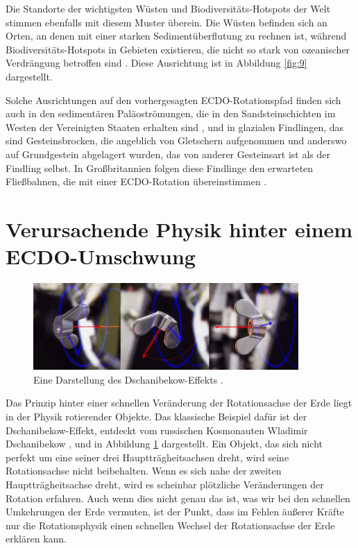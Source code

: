 \documentclass[10pt,twocolumn,letterpaper]{article}
\begin{document}
Die Standorte der wichtigsten Wüsten und Biodiversitäts-Hotspots der Welt stimmen ebenfalls mit diesem Muster überein. Die Wüsten befinden sich an Orten, an denen mit einer starken Sedimentüberflutung zu rechnen ist, während Biodiversitäts-Hotspots in Gebieten existieren, die nicht so stark von ozeanischer Verdrängung betroffen sind \cite{28}. Diese Ausrichtung ist in Abbildung \ref{fig:9} dargestellt.

Solche Ausrichtungen auf den vorhergesagten ECDO-Rotationspfad finden sich auch in den sedimentären Paläoströmungen, die in den Sandsteinschichten im Westen der Vereinigten Staaten erhalten sind \cite{21}, und in glazialen Findlingen, das sind Gesteinsbrocken, die angeblich von Gletschern aufgenommen und anderswo auf Grundgestein abgelagert wurden, das von anderer Gesteinsart ist als der Findling selbst. In Großbritannien folgen diese Findlinge den erwarteten Fließbahnen, die mit einer ECDO-Rotation übereinstimmen \cite{67,68}.

\section{Verursachende Physik hinter einem ECDO-Umschwung}

\begin{figure}
\begin{center}

\includegraphics[width=0.9\textwidth]{dzhani.jpg}
\end{center}
   \caption{Eine Darstellung des Dschanibekow-Effekts \cite{28}.}
\label{fig:10}
\end{figure}

Das Prinzip hinter einer schnellen Veränderung der Rotationsachse der Erde liegt in der Physik rotierender Objekte. Das klassische Beispiel dafür ist der Dschanibekow-Effekt, entdeckt vom russischen Kosmonauten Wladimir Dschanibekow \cite{37}, und in Abbildung \ref{fig:10} dargestellt. Ein Objekt, das sich nicht perfekt um eine seiner drei Hauptträgheitsachsen dreht, wird seine Rotationsachse nicht beibehalten. Wenn es sich nahe der zweiten Hauptträgheitsachse dreht, wird es scheinbar plötzliche Veränderungen der Rotation erfahren. Auch wenn dies nicht genau das ist, was wir bei den schnellen Umkehrungen der Erde vermuten, ist der Punkt, dass im Fehlen äußerer Kräfte nur die Rotationsphysik einen schnellen Wechsel der Rotationsachse der Erde erklären kann.
\end{document}
